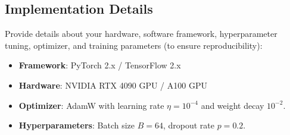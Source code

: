 \subsection{Implementation Details}
Provide details about your hardware, software framework, hyperparameter tuning, optimizer, and training parameters (to ensure reproducibility):
\begin{itemize}
    \item \textbf{Framework}: PyTorch 2.x / TensorFlow 2.x
    \item \textbf{Hardware}: NVIDIA RTX 4090 GPU / A100 GPU
    \item \textbf{Optimizer}: AdamW with learning rate $\eta = 10^{-4}$ and weight decay $10^{-2}$.
    \item \textbf{Hyperparameters}: Batch size $B = 64$, dropout rate $p = 0.2$.
\end{itemize}
